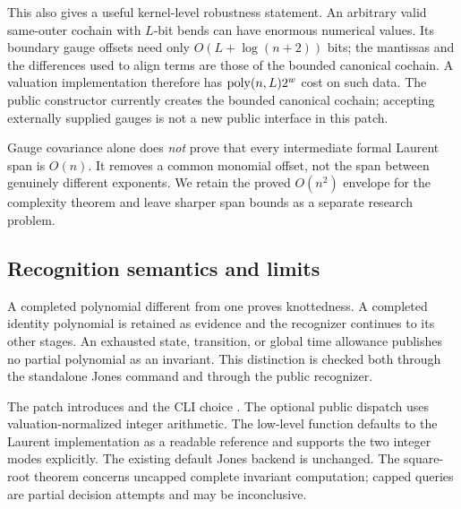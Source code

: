 This also gives a useful kernel-level robustness statement. An arbitrary
valid same-outer cochain with $L$-bit bends can have enormous numerical
values. Its boundary gauge offsets need only $O(L+\log(n+2))$ bits; the
mantissas and the differences used to align terms are those of the bounded
canonical cochain. A valuation implementation therefore has
$\operatorname{poly}(n,L)2^w$ cost on such data. The public constructor currently creates
the bounded canonical cochain; accepting externally supplied gauges is
not a new public interface in this patch.

Gauge covariance alone does \emph{not} prove that every intermediate formal
Laurent span is $O(n)$. It removes a common monomial offset, not the span
between genuinely different exponents. We retain the proved $O(n^2)$
envelope for the complexity theorem and leave sharper span bounds as a
separate research problem.

\subsection{Recognition semantics and limits}

A completed polynomial different from one proves knottedness. A completed
identity polynomial is retained as evidence and the recognizer continues to
its other stages. An exhausted state, transition, or global time allowance
publishes no partial polynomial as an invariant. This distinction is checked
both through the standalone Jones command and through the public recognizer.

The patch introduces  and the CLI choice
. The optional public dispatch uses valuation-normalized
integer arithmetic. The low-level  function defaults to
the Laurent implementation as a readable reference and supports the two
integer modes explicitly. The existing default Jones backend is unchanged.
The square-root theorem concerns uncapped complete invariant computation;
capped queries are partial decision attempts and may be inconclusive.
